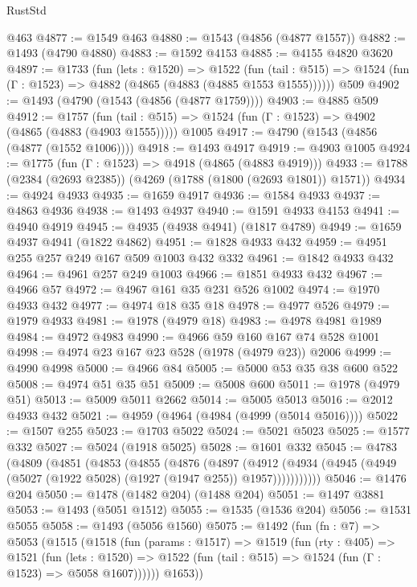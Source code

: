 \begin{lexlean}{RustStd}
\begin{coremodule}
    @463
@4877 := @1549 @463
@4880 := @1543 (@4856 (@4877 @1557))
@4882 := @1493 (@4790 @4880)
@4883 := @1592 @4153
@4885 := @4155 @4820 @3620
@4897 := @1733
    (fun (lets : @1520) =>
    @1522
      (fun (tail : @515) => @1524 (fun (Γ : @1523) => @4882 (@4865 (@4883 (@4885 @1553 @1555))))))
    @509
@4902 := @1493 (@4790 (@1543 (@4856 (@4877 @1759))))
@4903 := @4885 @509
@4912 := @1757
    (fun (tail : @515) => @1524 (fun (Γ : @1523) => @4902 (@4865 (@4883 (@4903 @1555)))))
    @1005
@4917 := @4790 (@1543 (@4856 (@4877 (@1552 @1006))))
@4918 := @1493 @4917
@4919 := @4903 @1005
@4924 := @1775 (fun (Γ : @1523) => @4918 (@4865 (@4883 @4919)))
@4933 := @1788 (@2384 (@2693 @2385)) (@4269 (@1788 (@1800 (@2693 @1801)) @1571))
@4934 := @4924 @4933
@4935 := @1659 @4917
@4936 := @1584 @4933
@4937 := @4863 @4936
@4938 := @1493 @4937
@4940 := @1591 @4933 @4153
@4941 := @4940 @4919
@4945 := @4935 (@4938 @4941) (@1817 @4789)
@4949 := @1659 @4937 @4941 (@1822 @4862)
@4951 := @1828 @4933 @432
@4959 := @4951 @255 @257 @249 @167 @509 @1003 @432 @332
@4961 := @1842 @4933 @432
@4964 := @4961 @257 @249 @1003
@4966 := @1851 @4933 @432
@4967 := @4966 @57
@4972 := @4967 @161 @35 @231 @526 @1002
@4974 := @1970 @4933 @432
@4977 := @4974 @18 @35 @18
@4978 := @4977 @526
@4979 := @1979 @4933
@4981 := @1978 (@4979 @18)
@4983 := @4978 @4981 @1989
@4984 := @4972 @4983
@4990 := @4966 @59 @160 @167 @74 @528 @1001
@4998 := @4974 @23 @167 @23 @528 (@1978 (@4979 @23)) @2006
@4999 := @4990 @4998
@5000 := @4966 @84
@5005 := @5000 @53 @35 @38 @600 @522
@5008 := @4974 @51 @35 @51
@5009 := @5008 @600
@5011 := @1978 (@4979 @51)
@5013 := @5009 @5011 @2662
@5014 := @5005 @5013
@5016 := @2012 @4933 @432
@5021 := @4959 (@4964 (@4984 (@4999 (@5014 @5016))))
@5022 := @1507 @255
@5023 := @1703 @5022
@5024 := @5021 @5023
@5025 := @1577 @332
@5027 := @5024 (@1918 @5025)
@5028 := @1601 @332
@5045 := @4783
    (@4809
      (@4851
        (@4853
          (@4855
            (@4876
              (@4897
                (@4912
                  (@4934 (@4945 (@4949 (@5027 (@1922 @5028) (@1927 (@1947 @255)) @1957)))))))))))
@5046 := @1476 @204
@5050 := @1478 (@1482 @204) (@1488 @204)
@5051 := @1497 @3881
@5053 := @1493 (@5051 @1512)
@5055 := @1535 (@1536 @204)
@5056 := @1531 @5055
@5058 := @1493 (@5056 @1560)
@5075 := @1492
    (fun (fn : @7) =>
    @5053
      (@1515
        (@1518
          (fun (params : @1517) =>
          @1519
            (fun (rty : @405) =>
            @1521
              (fun (lets : @1520) =>
              @1522 (fun (tail : @515) => @1524 (fun (Γ : @1523) => @5058 @1607))))))
        @1653))

\end{coremodule}
\end{lexlean}
